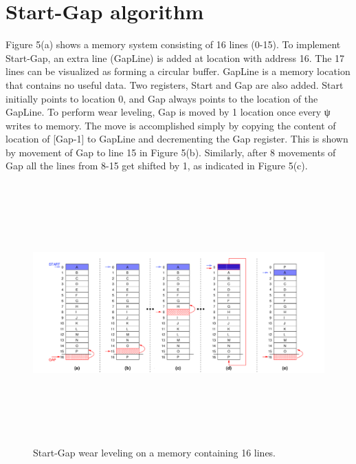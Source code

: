\documentclass[11pt, conference, onecolumn]{IEEEtran}
\begin{document}
\section{Start-Gap algorithm}
Figure 5(a) shows a memory system consisting of 16 lines (0-15). To implement Start-Gap, an extra line (GapLine) is added at
location with address 16. The 17 lines can be visualized as forming
a circular buffer. GapLine is a memory location that contains no
useful data. Two registers, Start and Gap are also added. Start
initially points to location 0, and Gap always points to the location
of the GapLine. To perform wear leveling, Gap is moved by 1
location once every ψ writes to memory. The move is accomplished
simply by copying the content of location of [Gap-1] to GapLine
and decrementing the Gap register. This is shown by movement of
Gap to line 15 in Figure 5(b). Similarly, after 8 movements of Gap
all the lines from 8-15 get shifted by 1, as indicated in Figure 5(c).\\
	\begin{figure}
		\begin{center}
		\includegraphics[width=20cm, height=10cm]{sga.png}
		\caption {Start-Gap wear leveling on a memory containing 16 lines.}
		\end{center}	
	\end{figure}
\end{document}
